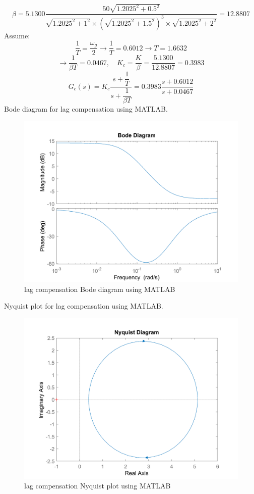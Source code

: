 $$
\beta = 5.1300\dfrac{50\sqrt{1.2025^2+0.5^2}}{\sqrt{1.2025^2+1^2}\times(\sqrt{1.2025^2 + 1.5^2})^3\times\sqrt{1.2025^2 + 2^2}} = 12.8807
$$
Assume:
$$
\dfrac{1}{T} = \dfrac{\omega_g}{2} 
\to \dfrac{1}{T}  = 0.6012 \to T = 1.6632
$$
$$
\to \dfrac{1}{\beta T} = 0.0467, \quad K_c = \dfrac{K}{\beta} = \dfrac{5.1300}{12.8807} = 0.3983
$$
$$
G_c(s) = K_c \dfrac{s + \dfrac{1}{T}}{s + \dfrac{1}{\beta T}}
= 0.3983 \dfrac{s + 0.6012}{s + 0.0467}
$$
Bode diagram for lag compensation using MATLAB.
\begin{figure}[H]
	\caption{lag compensation Bode diagram using MATLAB}
	\centering
	\includegraphics[width=12cm]{../Figure/Q1/b/controller.png}
\end{figure}
Nyquist plot for lag compensation using MATLAB.
\begin{figure}[H]
	\caption{lag compensation Nyquist plot using MATLAB}
	\centering
	\includegraphics[width=12cm]{../Figure/Q1/b/controller_nyquist.png}
\end{figure}

